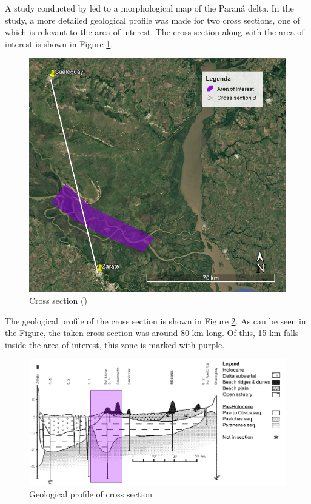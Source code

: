A study conducted by \citeauthor{cavallottoEvolucionCambiosAmbientales2005} led to a morphological map of the Paraná delta. In the study, a more detailed geological profile was made for two cross sections, one of which is relevant to the area of interest. The cross section along with the area of interest is shown in Figure \ref{fig:crosssectiongeo}.

\begin{figure}[H]
    \centering
    \includegraphics[width=0.55\linewidth]{figures/ch9/CrossSectionB.png}
    \caption{Cross section (\autocite{googleGoogleEarth})}
    \label{fig:crosssectiongeo}
\end{figure}

The geological profile of the cross section is shown in Figure \ref{fig:geolprofile}. As can be seen in the Figure, the taken cross section was around 80 km long. Of this, 15 km falls inside the area of interest, this zone is marked with purple.

\begin{figure}[H]
    \centering
    \includegraphics[width=0.75\linewidth]{figures/ch9/CrossSectionBResults.png}
    \caption{Geological profile of cross section \autocite{cavallottoEvolucionCambiosAmbientales2005}}
    \label{fig:geolprofile}
\end{figure}


